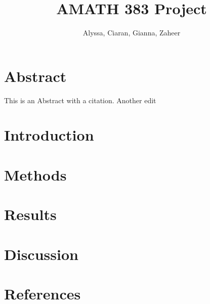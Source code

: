 \documentclass{article}
\title{AMATH 383 Project}
\author{Alyssa, Ciaran, Gianna, Zaheer}
\begin{document}
    \maketitle
    

    \section{Abstract}
    This is an Abstract with a citation\cite{gonzalez-bailon_dynamics_2011}. Another edit
    \section{Introduction}
    \section{Methods}
    \section{Results}
    \section{Discussion}
    \section{References}
    
    
    
\end{document}
